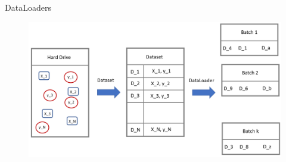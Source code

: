 \begin{frame}[allowframebreaks]{DataLoaders}
\framebreak

\begin{figure}
    \centering
    \includegraphics[width=1.0\textwidth,height=1.0\textheight,keepaspectratio]{images/dataloaders.png}
\end{figure}
\end{frame} 